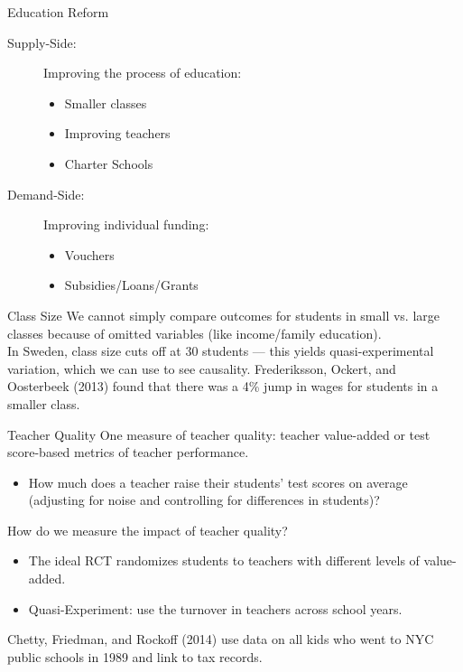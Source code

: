 \documentclass[8pt]{extarticle}
\begin{document}
  \begin{problem}{Education Reform}
    \begin{description}
      \item[Supply-Side:] Improving the process of education:
        \begin{itemize}
          \item Smaller classes
          \item Improving teachers
          \item Charter Schools
        \end{itemize}
      \item[Demand-Side:] Improving individual funding:
        \begin{itemize}
          \item Vouchers
          \item Subsidies/Loans/Grants
        \end{itemize}
    \end{description}
    \begin{problem}{Class Size}
      We cannot simply compare outcomes for students in small vs. large classes because of omitted variables (like income/family education).\\

      In Sweden, class size cuts off at 30 students --- this yields quasi-experimental variation, which we can use to see causality. Frederiksson, Ockert, and Oosterbeek (2013) found that there was a 4\% jump in wages for students in a smaller class.
    \end{problem}
    \begin{problem}{Teacher Quality}
      One measure of teacher quality: teacher value-added or test score-based metrics of teacher performance.
      \begin{itemize}
        \item How much does a teacher raise their students' test scores on average (adjusting for noise and controlling for differences in students)?
      \end{itemize}
      How do we measure the impact of teacher quality?
      \begin{itemize}
        \item The ideal RCT randomizes students to teachers with different levels of value-added.
        \item Quasi-Experiment: use the turnover in teachers across school years.
      \end{itemize}
      Chetty, Friedman, and Rockoff (2014) use data on all kids who went to NYC public schools in 1989 and link to tax records.\\


\end{problem}
\end{problem}
\end{document}
